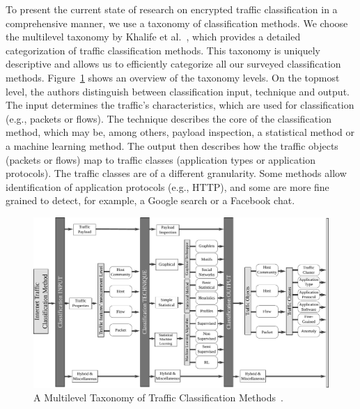 To present the current state of research on encrypted traffic classification in a comprehensive manner, we use a taxonomy of classification methods. We choose the multilevel taxonomy by Khalife et al.~\cite{Khalife-2014-multilevel}, which provides a detailed categorization of traffic classification methods. This taxonomy is uniquely descriptive and allows us to efficiently categorize all our surveyed classification methods. Figure~\ref{fig:taxonomy} shows an overview of the taxonomy levels. On the topmost level, the authors distinguish between classification input, technique and output. The input determines the traffic's characteristics, which are used for classification (e.g., packets or flows). The technique describes the core of the classification method, which may be, among others, payload inspection, a statistical method or a machine learning method. The output then describes how the traffic objects (packets or flows) map to traffic classes (application types or application protocols). The traffic classes are of a different granularity. Some methods allow identification of application protocols (e.g., HTTP), and some are more fine grained to detect, for example, a Google search or a Facebook chat.

\begin{figure}[!ht]
	\begin{center}
		\includegraphics[width=\textwidth]{figures/taxonomy}
		\caption{A Multilevel Taxonomy of Traffic Classification Methods~\cite{Khalife-2014-multilevel}.} 
		\label{fig:taxonomy}
	\end{center}
\end{figure}

